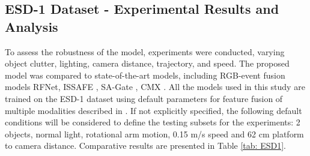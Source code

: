 \documentclass[lettersize,journal]{IEEEtran}
\begin{document}
 



 












\subsection{\textbf{ESD-1 Dataset - Experimental Results and Analysis}}
\label{section:Results ESD-1 Dataset}


To assess the robustness of the model, experiments were conducted, varying object clutter, lighting, camera distance, trajectory, and speed. The proposed model was compared to state-of-the-art models, including RGB-event fusion models RFNet\cite{Sun2020Real-TimeDetection}, ISSAFE \cite{Zhang2020ISSAFE:Data}, SA-Gate \cite{Xiaokang2020Bi-directionalSegmentation}, CMX \cite{Liu2022CMX:Transformers}. All the models used in this study are trained on the ESD-1 dataset \cite{Huang2023AEnvironment} using default parameters for feature fusion of multiple modalities described in \cite{Liu2022CMX:Transformers}. If not explicitly specified, the following default conditions will be considered to define the testing subsets for the experiments: 2 objects, normal light, rotational arm motion, 0.15 m/s speed and 62 cm platform to camera distance. Comparative results are presented in Table \ref{tab: ESD1}.
\end{document}
